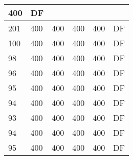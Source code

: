 \begin{table}[]
\begin{tabular}{lllll|l|}
400                                & DF                                    \\ \hline
201                                 & 400                                & 400                                & 400                                & 
400                                & DF                                    \\ \hline
100                                 & 400                                & 400                                & 400                                & 
400                                & DF                                    \\ \hline
98                                  & 400                                & 400                                & 400                                & 
400                                & DF                                    \\ \hline
96                                  & 400                                & 400                                & 400                                & 
400                                & DF                                    \\ \hline
95                                  & 400                                & 400                                & 400                                & 
400                                & DF                                    \\ \hline
94                                  & 400                                & 400                                & 400                                & 
400                                & DF                                    \\ \hline
93                                  & 400                                & 400                                & 400                                & 
400                                & DF                                    \\ \hline
94                                  & 400                                & 400                                & 400                                & 
400                                & DF                                    \\ \hline
95                                  & 400                                & 400                                & 400                                & 
400                                & DF                                    \\ \hline

\end{tabular}
\end{table}
